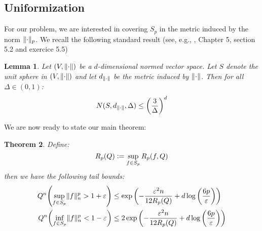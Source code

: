 \documentclass{article}
\theoremstyle{plain}
\newtheorem{lemma}{Lemma}
\newtheorem{theorem}[lemma]{Theorem}
\theoremstyle{definition}
\theoremstyle{remark}
\newcommand{\defeq}{\vcentcolon=}
\DeclarePairedDelimiter{\paren}{\lparen}{\rparen}
\newcommand{\eps}{\varepsilon}
\newcommand{\logp}[1]{\log{\left(#1\right)}}
\DeclarePairedDelimiter{\norm}{\lVert}{\rVert}
\begin{document}
\subsection{Uniformization}

For our problem, we are interested in covering $S_p$ in the metric induced by the norm $\norm{\cdot}_p$. We recall the following standard result (see, e.g., \cite{van2014probability}, Chapter 5, section 5.2 and exercice 5.5)
\begin{lemma}
    Let $(V, \norm{\cdot})$ be a $d$-dimensional normed vector space. Let $S$ denote the unit sphere in $(V, \norm{\cdot})$ and let $d_{\norm{\cdot}}$ be the metric induced by $\norm{\cdot}$. Then for all $\Delta \in (0,1)$:
    \begin{equation*}
        N(S, d_{\norm{\cdot}}, \Delta) \leq \paren*{\frac{3}{\Delta}}^{d}
    \end{equation*}
\end{lemma}
We are now ready to state our main theorem:
\begin{theorem}
\label{th:1}
Define:
\begin{equation*}
    R_p(Q) \defeq \sup_{f \in S_p} R_p(f, Q)
\end{equation*}
then we have the following tail bounds:
\begin{align*}
    Q^{n}\paren*{\sup_{f \in S_p} \norm{f}_n^p > 1 + \eps} &\leq \exp{\paren*{-\frac{\eps^2n}{12 R_p(Q)} + d \logp{\frac{6p}{\eps}}}} \\
    Q^{n}\paren*{\inf_{f \in S_p} \norm{f}_n^p < 1 - \eps} &\leq 2 \exp{\paren*{-\frac{\eps^2n}{12 R_p(Q)} + d \logp{\frac{6p}{\eps}}}}
\end{align*}
\end{theorem}
\end{document}
